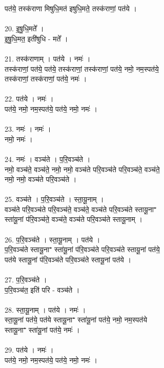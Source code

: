पत॑ये॒ तस्क॑राणा मिषुधि॒मत॑ इषुधि॒मते॒ तस्क॑राणां॒ पत॑ये ।\\
\\
20. इ॒षु॒धि॒मते᳚ ।\\
इ॒षु॒धि॒मत॒ इती॑षुधि - मते᳚ ।\\
\\
21. तस्क॑राणाम् । पत॑ये । नमः॑ ।\\
तस्क॑राणां॒ पत॑ये॒ पत॑ये॒ तस्क॑राणां॒ तस्क॑राणां॒ पत॑ये॒ नमो॒ नम॒स्पत॑ये॒\\
तस्क॑राणां॒ तस्क॑राणां॒ पत॑ये॒ नमः॑ ।\\
\\
22. पत॑ये । नमः॑ ।\\
पत॑ये॒ नमो॒ नम॒स्पत॑ये॒ पत॑ये॒ नमो॒ नमः॑ ।\\
\\
23. नमः॑ । नमः॑ ।\\
नमो॒ नमः॑ ।\\
\\
24. नमः॑ । वञ्च॑ते । प॒रि॒वञ्च॑ते ।\\
नमो॒ वञ्च॑ते॒ वञ्च॑ते॒ नमो॒ नमो॒ वञ्च॑ते परि॒वञ्च॑ते परि॒वञ्च॑ते॒ वञ्च॑ते॒\\
नमो॒ नमो॒ वञ्च॑ते परि॒वञ्च॑ते ।\\
\\
25. वञ्च॑ते । प॒रि॒वञ्च॑ते । स्ता॒यू॒नाम् ।\\
वञ्च॑ते परि॒वञ्च॑ते परि॒वञ्च॑ते॒ वञ्च॑ते॒ वञ्च॑ते परि॒वञ्च॑ते स्तायू॒नाꣲ\\
स्ता॑यू॒नां प॑रि॒वञ्च॑ते॒ वञ्च॑ते॒ वञ्च॑ते परि॒वञ्च॑ते स्तायू॒नाम् ।\\
\\
26. प॒रि॒वञ्च॑ते । स्ता॒यू॒नाम् । पत॑ये ।\\
प॒रि॒वञ्च॑ते स्तायू॒नाꣲ स्ता॑यू॒नां प॑रि॒वञ्च॑ते परि॒वञ्च॑ते स्तायू॒नां पत॑ये॒\\
पत॑ये स्तायू॒नां प॑रि॒वञ्च॑ते परि॒वञ्च॑ते स्तायू॒नां पत॑ये ।\\
\\
27. प॒रि॒वञ्च॑ते ।\\
प॒रि॒वञ्च॑त॒ इति॑ परि - वञ्च॑ते ।\\
\\
28. स्ता॒यू॒नाम् । पत॑ये । नमः॑ ।\\
स्ता॒यू॒नां पत॑ये॒ पत॑ये स्तायू॒नाꣲ स्ता॑यू॒नां पत॑ये॒ नमो॒ नम॒स्पत॑ये\\
स्तायू॒नाꣲ स्ता॑यू॒नां पत॑ये॒ नमः॑ ।\\
\\
29. पत॑ये । नमः॑ ।\\
पत॑ये॒ नमो॒ नम॒स्पत॑ये॒ पत॑ये॒ नमो॒ नमः॑ ।\\
